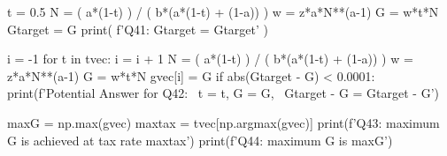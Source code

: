 \documentclass[14pt]{extarticle}
\begin{document}
\begin{Exercise}
\begin{pythoncode}
t = 0.5
N = ( a*(1-t) ) / ( b*(a*(1-t) + (1-a)) )
w = z*a*N**(a-1)
G = w*t*N
Gtarget = G
print( f'Q41: Gtarget = {Gtarget}' )

i = -1
for t in tvec:
    i = i + 1
    N = ( a*(1-t) ) / ( b*(a*(1-t) + (1-a)) )
    w = z*a*N**(a-1)
    G = w*t*N
    gvec[i] = G
    if abs(Gtarget - G) < 0.0001:
        print(f'Potential Answer for Q42: \
                t = {t}, G = {G}, \
                Gtarget - G = {Gtarget - G}')


maxG = np.max(gvec)
maxtax = tvec[np.argmax(gvec)]
print(f'Q43: maximum G is achieved at tax rate {maxtax}')
print(f'Q44: maximum G is {maxG}')
\end{pythoncode}



\end{Exercise}
\end{document}
